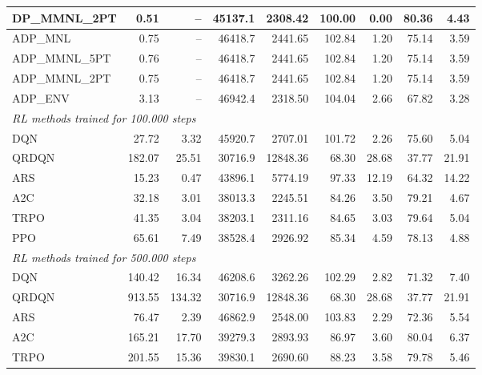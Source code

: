 \begin{samepage}
\begin{center}
\begin{tabular}{l|rr|rr|rr|rr}
    DP\_MMNL\_2PT &     0.51 &    -- &    45137.1 &    2308.42 &  100.00 &    0.00 &   80.36 &    4.43 \\
    \midrule
    ADP\_MNL     &     0.75 &    -- &    46418.7 &    2441.65 &  102.84 &    1.20 &   75.14 &    3.59 \\
    ADP\_MMNL\_5PT &     0.76 &    -- &    46418.7 &    2441.65 &  102.84 &    1.20 &   75.14 &    3.59 \\
    ADP\_MMNL\_2PT &     0.75 &    -- &    46418.7 &    2441.65 &  102.84 &    1.20 &   75.14 &    3.59 \\
    ADP\_ENV     &     3.13 &    -- &    46942.4 &    2318.50 &  104.04 &    2.66 &   67.82 &    3.28 \\
    \midrule
    \multicolumn{9}{l}{\textit{RL methods trained for 100.000 steps}} \\
    \midrule
    DQN          &    27.72 &     3.32 &    45920.7 &    2707.01 &  101.72 &    2.26 &   75.60 &    5.04 \\
    QRDQN        &   182.07 &    25.51 &    30716.9 &   12848.36 &   68.30 &   28.68 &   37.77 &   21.91 \\
    ARS          &    15.23 &     0.47 &    43896.1 &    5774.19 &   97.33 &   12.19 &   64.32 &   14.22 \\
    A2C          &    32.18 &     3.01 &    38013.3 &    2245.51 &   84.26 &    3.50 &   79.21 &    4.67 \\
    TRPO         &    41.35 &     3.04 &    38203.1 &    2311.16 &   84.65 &    3.03 &   79.64 &    5.04 \\
    PPO          &    65.61 &     7.49 &    38528.4 &    2926.92 &   85.34 &    4.59 &   78.13 &    4.88 \\
    \midrule
    \multicolumn{9}{l}{\textit{RL methods trained for 500.000 steps}} \\
    \midrule
    DQN          &   140.42 &    16.34 &    46208.6 &    3262.26 &  102.29 &    2.82 &   71.32 &    7.40 \\
    QRDQN        &   913.55 &   134.32 &    30716.9 &   12848.36 &   68.30 &   28.68 &   37.77 &   21.91 \\
    ARS          &    76.47 &     2.39 &    46862.9 &    2548.00 &  103.83 &    2.29 &   72.36 &    5.54 \\
    A2C          &   165.21 &    17.70 &    39279.3 &    2893.93 &   86.97 &    3.60 &   80.04 &    6.37 \\
    TRPO         &   201.55 &    15.36 &    39830.1 &    2690.60 &   88.23 &    3.58 &   79.78 &    5.46 \\

\end{tabular}
\end{center}
\end{samepage}

